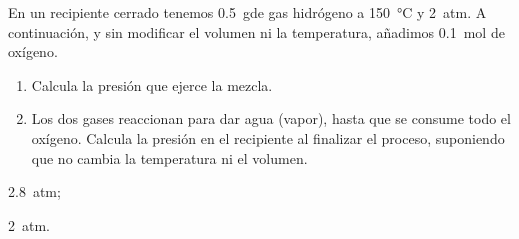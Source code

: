 \begin{exercise}[
    tags    = {termodinámica, entalpía, entalpia de reacción, calor},
    topics  = {química, termoquímica, termodinámica},
    source  = {FQ 1B SAN 2015, p68, e61},
  ]
  En un recipiente cerrado tenemos \SI{0.5}{\gram}de gas hidrógeno a \SI{150}{\celsius} y \SI{2}{atm}. A continuación,
  y sin modificar el volumen ni la temperatura,
  añadimos \SI{0.1}{\mole} de oxígeno.
  \begin{enumerate}
    \item Calcula la presión que ejerce la mezcla.
    \item Los dos gases reaccionan para dar agua (vapor), hasta
    que se consume todo el oxígeno. Calcula la presión
    en el recipiente al finalizar el proceso, suponiendo que
    no cambia la temperatura ni el volumen.
  \end{enumerate}
\end{exercise}

\begin{solution}
  \begin{enumerate*}
    \item \SI{2.8}{atm};
    \item \SI{2}{atm}.
  \end{enumerate*}
\end{solution}
